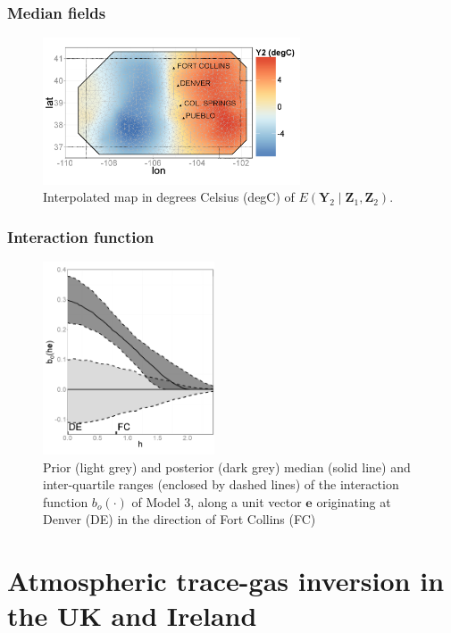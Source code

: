 \documentclass{beamer}
\newcommand{\Yvec}{\mathbf{Y}}
\newcommand{\Zvec}{\mathbf{Z}}
\newcommand{\E}{E}
\begin{document}
\begin{frame}
\frametitle{Median fields}
\begin{figure}
\includegraphics[width=3in]{Fig3a2.png}
\caption{Interpolated map in degrees Celsius (degC) of $\E(\Yvec_2 \mid  \Zvec_1,\Zvec_2)$.}
\end{figure}
\end{frame}


\begin{frame}
\frametitle{Interaction function}


\vspace{-0.1in}
\begin{figure}
\includegraphics[width=2in]{Fig3b.png}
\caption{\small Prior (light grey) and posterior (dark grey) median (solid line) and inter-quartile ranges (enclosed by dashed lines) of the interaction function $b_o(\cdot)$ of Model 3, along a unit vector $\mathbf{e}$ originating at Denver (DE) in the direction of Fort Collins (FC)} 
\end{figure}

\end{frame}

\normalsize


\section{Atmospheric trace-gas inversion in the UK and Ireland}


\begin{frame}
\sectionpage
\end{frame}
\end{document}
